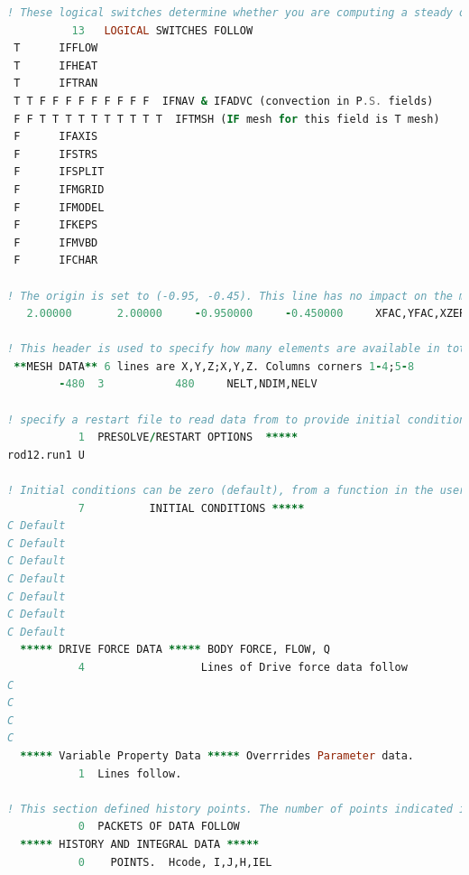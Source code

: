 \documentclass[10pt]{article}
\numberwithin{equation}{section} %
\begin{document}
\begin{itemize}
\begin{lstlisting}[language=Fortran]
! These logical switches determine whether you are computing a steady or unsteady solution and whether advection is turned on.
          13   LOGICAL SWITCHES FOLLOW
 T      IFFLOW
 T      IFHEAT
 T      IFTRAN
 T T F F F F F F F F F  IFNAV & IFADVC (convection in P.S. fields)
 F F T T T T T T T T T T  IFTMSH (IF mesh for this field is T mesh)
 F      IFAXIS
 F      IFSTRS
 F      IFSPLIT
 F      IFMGRID
 F      IFMODEL
 F      IFKEPS
 F      IFMVBD
 F      IFCHAR
 
! The origin is set to (-0.95, -0.45). This line has no impact on the mesh being read in Nek.
   2.00000       2.00000     -0.950000     -0.450000     XFAC,YFAC,XZERO,YZERO

! This header is used to specify how many elements are available in total, the dimension of the problem, and how many elements are in the flow mesh (the fluid region?). 
 **MESH DATA** 6 lines are X,Y,Z;X,Y,Z. Columns corners 1-4;5-8
        -480  3           480     NELT,NDIM,NELV
        
! specify a restart file to read data from to provide initial conditions (used commonly for these nonlinear equations). This is used to reduce error, since the rod12.run1 file likely was run with a much lower order. For a higher-order timestepping scheme, you'll need an equivalently larger number of restart files to provide the data points for method of lines time integration. This initial condition does not need to be of the same order as the current simulation. You can also specify the velocity and temperature from different files. The initial time is taken from the last specified restart file, but this can be overridden.
           1  PRESOLVE/RESTART OPTIONS  *****
rod12.run1 U

! Initial conditions can be zero (default), from a function in the user file, based on a ``pre-solve'', where a steady-state solution such as the Stokes equation is used as the initial condition for the transient solve, or from a restart file.
           7          INITIAL CONDITIONS *****
C Default
C Default
C Default
C Default
C Default
C Default
C Default
  ***** DRIVE FORCE DATA ***** BODY FORCE, FLOW, Q
           4                  Lines of Drive force data follow
C
C
C
C
  ***** Variable Property Data ***** Overrrides Parameter data.
           1  Lines follow.

! This section defined history points. The number of points indicated is the number of lines that should follow. This can be used to write velocity components and pressure to the .sch file at each output step (when mod(istep, iohis) = 0).
           0  PACKETS OF DATA FOLLOW
  ***** HISTORY AND INTEGRAL DATA *****
           0    POINTS.  Hcode, I,J,H,IEL


\end{lstlisting}
\end{itemize}
\end{document}
